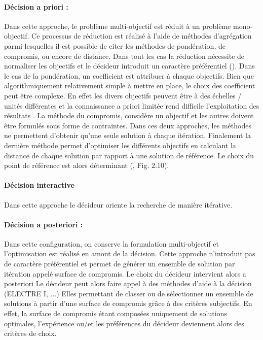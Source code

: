 \paragraph{Décision a priori :} %
\label{par:decision_a_priori}
Dans cette approche, le problème multi-objectif est réduit à un problème mono-objectif.
Ce processus de réduction est réalisé à l’aide de méthodes d’agrégation parmi lesquelles
il est possible de citer les méthodes de pondération, de compromis,
ou encore de distance. Dans tout les cas la réduction nécessite de normaliser les
objectifs et le décideur introduit un caractère préférentiel (\cite{Rivallain2013,Armand-Decker2015}).
Dans le cas de la pondération, un coefficient est attribuer à chaque objectifs. Bien que
algorithmiquement relativement simple à mettre en place, le choix des coefficient peut être complexe.
En effet les divers objectifs peuvent être à des échelles / unités différentes
et la connaissance a priori limitée rend difficile l’exploitation des résultats .
La méthode du compromis, considère un objectif et les autres doivent être formulés
sous forme de contraintes.
Dans ces deux approches, les méthodes ne permettent d’obtenir qu’une seule
solution à chaque itération.
Finalement la dernière méthode permet d’optimiser les différents objectifs en calculant
la distance de chaque solution par rapport à une solution de référence. Le choix
du point de référence est alors déterminant (\cite{Collette2002}, Fig. 2.10).

\paragraph{Décision interactive} %
\label{par:decision_interactive}
Dans cette approche le décideur oriente la recherche de manière itérative.

\paragraph{Décision a posteriori :} %
\label{par:decision_a_posteriori}
Dans cette configuration, on conserve la formulation multi-objectif et l’optimisation
est réalisé en amont de la décision. Cette approche n’introduit pas de
caractère préférentiel et permet de générer un ensemble de solution par itération
appelé surface de compromis.
Le choix du décideur intervient alors a posteriori
Le décideur peut alors faire appel à des méthodes d’aide à la décision (ELECTRE I, ...)
Elles permettant de classer ou de sélectionner un ensemble de solutions
à partir d’une surface de compromis grâce à des critères subjectifs. En effet, la
surface de compromis étant composées uniquement de solutions optimales, l’expérience ou/et
les préférences du décideur deviennent alors des critères de choix.

